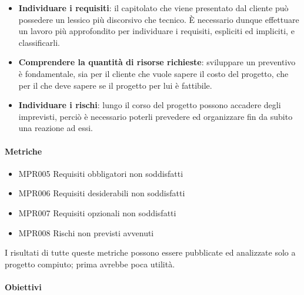 		\begin{itemize}
			\item \textbf{Individuare i requisiti}: il capitolato che viene presentato dal cliente può possedere un lessico più discorsivo che tecnico.
			È necessario dunque effettuare un lavoro più approfondito per individuare i requisiti, espliciti ed impliciti, e classificarli.
			\item \textbf{Comprendere la quantità di risorse richieste}: sviluppare un preventivo è fondamentale, sia per il cliente che vuole sapere il costo del progetto, che per il  che deve sapere se il progetto per lui è fattibile.
			\item \textbf{Individuare i rischi}: lungo il corso del progetto possono accadere degli imprevisti, perciò è necessario poterli prevedere ed organizzare fin da subito una reazione ad essi.
		\end{itemize}

		\paragraph*{Metriche}

		\begin{itemize}
			\item MPR005 Requisiti obbligatori non soddisfatti
			\item MPR006 Requisiti desiderabili non soddisfatti
			\item MPR007 Requisiti opzionali non soddisfatti
			\item MPR008 Rischi non previsti avvenuti
		\end{itemize}
		I risultati di tutte queste metriche possono essere pubblicate ed analizzate solo a progetto compiuto; prima avrebbe poca utilità. 
	
		\paragraph*{Obiettivi}
		
